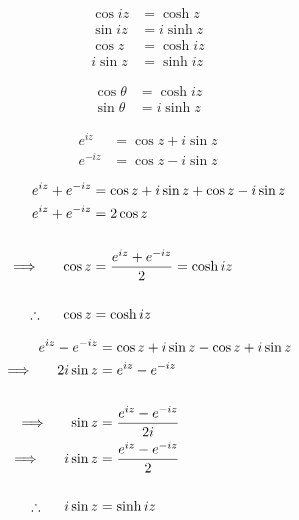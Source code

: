 \documentclass[11pt,a4paper]{article}
\begin{document}
\begin{align*}
\cos iz & = \cosh z\\
\sin iz & = i\sinh z \\
\cos z & = \cosh iz\\
i \sin z & = \sinh iz
\end{align*}




\begin{align*}
\cos \theta & = \cosh iz\\
\sin \theta & = i\sinh z
\end{align*}



\begin{align*}
e^{iz} & = \cos z + i\sin z\\
e^{-iz} & = \cos z - i\sin z
\end{align*}



\begin{align*}
e^{iz} + e^{-iz} & = \cos  z + i\sin  z + \cos z - i\sin z\\
e^{iz} + e^{-iz} & = 2\cos z\\\\
\implies \hspace{0.5cm} \cos z  &  = \dfrac{e^{iz} + e^{-iz} }{2} = \cosh i z\\\\
\therefore \hspace{0.5cm} \cos z & = \cosh i z
\end{align*}



\begin{align*}
e^{iz} - e^{-iz} & = \cos z + i\sin z - \cos z + i\sin z\\
\implies\hspace{0.5cm} 2i\sin z & = e^{iz} - e^{-iz} \\\\
\implies \hspace{0.5cm} \sin z & = \dfrac{e^{iz} - e^{-iz}}{2i}\\
\implies \hspace{0.5cm} i\sin z & = \dfrac{e^{iz} - e^{-iz}}{2}\\\\
\therefore\hspace{0.5cm} i\sin z & = \sinh iz\\\\
\end{align*}
\end{document}
